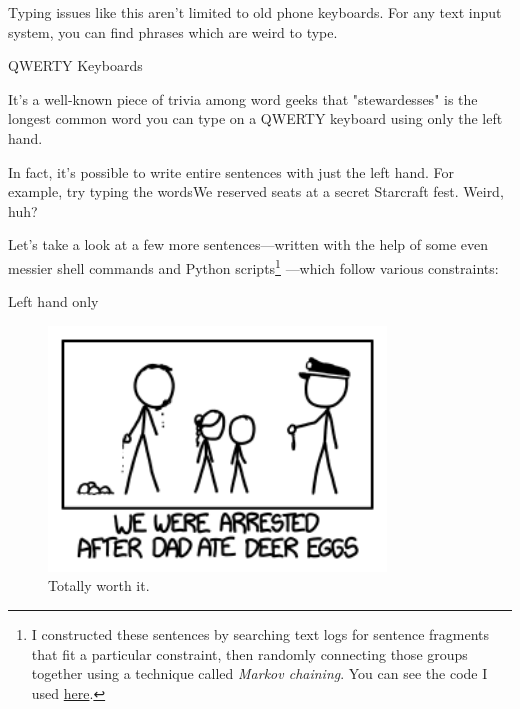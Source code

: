 {{Typing issues like this aren't limited to old phone keyboards. For any text input system, you can find phrases which are weird to type.}

{QWERTY Keyboards}

{It's a well-known piece of trivia among word geeks that "stewardesses" is the longest common word you can type on a QWERTY keyboard using only the left hand.}

{In fact, it's possible to write entire sentences with just the left hand. For example, try typing the wordsWe reserved seats at a secret Starcraft fest. Weird, huh?}

{Let's take a look at a few more sentences—written with the help of some even messier shell commands and Python scripts{\footnote{I constructed these sentences by searching text logs for sentence fragments that fit a particular constraint, then randomly connecting those groups together using a technique called \emph{Markov chaining}. You can see the code I used \href{http://xkcd.com/markov.py.txt}{here}.} } —which follow various constraints:}

{Left hand only}

\begin{figure}[!htbp]
\centering
\includegraphics[scale=0.5, max width=0.8\textwidth]{imgs/a/75/t9_arrested.png}
\caption{Totally worth it.}
\end{figure}

}
